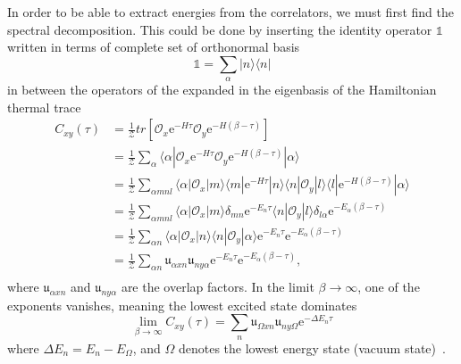 In order to be able to extract energies from the correlators, we must first find the spectral decomposition. This could be done by inserting the identity operator $\mathds{1}$ written in terms of complete set of orthonormal basis
\begin{equation}
    \mathds{1} = \sum_\alpha | n \rangle \langle n |
\end{equation}
in between the operators of the expanded in the eigenbasis of the Hamiltonian thermal trace
\begin{equation}
    \begin{aligned}
        C_{xy}(\tau) &= \frac{1}{\mathcal{Z}}tr\left[ \mathcal{O}_x\mathrm{e}^{-H\tau}\mathcal{O}_y\mathrm{e}^{-H(\beta - \tau)} \right] 
        \\
        &= \frac{1}{\mathcal{Z}}\sum_\alpha\langle \alpha | \mathcal{O}_x\mathrm{e}^{-H\tau}\mathcal{O}_y\mathrm{e}^{-H(\beta - \tau)} | \alpha \rangle 
        \\
        &= \frac{1}{\mathcal{Z}}\sum_{\alpha mnl} \langle \alpha | \mathcal{O}_x | m \rangle \langle m | \mathrm{e}^{-H\tau} | n \rangle \langle n | \mathcal{O}_y | l \rangle \langle l | \mathrm{e}^{-H(\beta - \tau)} | \alpha \rangle 
        \\
        &= \frac{1}{\mathcal{Z}}\sum_{\alpha mnl}\langle \alpha | \mathcal{O}_x | m \rangle \delta_{mn}\mathrm{e}^{-E_n\tau} \langle n | \mathcal{O}_y | l \rangle \delta_{l\alpha}\mathrm{e}^{-E_\alpha(\beta - \tau)}
        \\
        &= \frac{1}{\mathcal{Z}}\sum_{\alpha n}\langle \alpha | \mathcal{O}_x | n \rangle \langle n | \mathcal{O}_y | \alpha \rangle \mathrm{e}^{-E_n\tau} \mathrm{e}^{-E_\alpha(\beta - \tau)}
        \\
        &= \frac{1}{\mathcal{Z}}\sum_{\alpha n} \mathfrak{u}_{\alpha xn} \mathfrak{u}_{ ny\alpha} \mathrm{e}^{-E_n\tau} \mathrm{e}^{-E_\alpha(\beta - \tau)},
        \\
    \end{aligned}
    \label{eq:fit_exponent}
\end{equation}
where $\mathfrak{u}_{\alpha xn}$ and $\mathfrak{u}_{ ny\alpha}$ are the overlap factors. In the limit $\beta \to \infty$, one of the exponents vanishes, meaning the lowest excited state dominates
\begin{equation}
    \lim_{\beta \to \infty} C_{xy}(\tau) = \sum_{n} \mathfrak{u}_{\Omega xn} \mathfrak{u}_{ ny\Omega} \mathrm{e}^{-\Delta E_n\tau}
    \label{eq:beta_lim}
\end{equation}
where $\Delta E_n = E_n - E_\Omega$, and $\Omega$ denotes the lowest energy state (vacuum state)~\cite{evan}.

